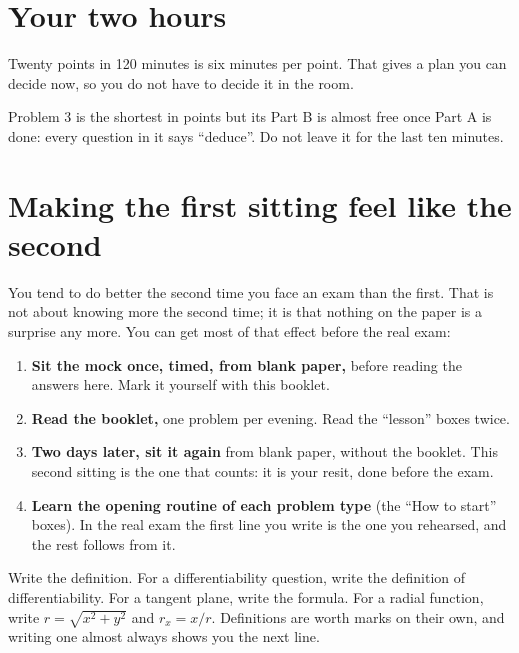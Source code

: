 \section{Your two hours}

Twenty points in 120 minutes is six minutes per point. That gives a plan you can decide now, so
you do not have to decide it in the room.

\begin{center}
\end{center}

Problem 3 is the shortest in points but its Part B is almost free once Part A is done: every
question in it says ``deduce''. Do not leave it for the last ten minutes.

\section{Making the first sitting feel like the second}

You tend to do better the second time you face an exam than the first. That is not about
knowing more the second time; it is that nothing on the paper is a surprise any more. You can
get most of that effect before the real exam:

\begin{enumerate}
  \item \textbf{Sit the mock once, timed, from blank paper,} before reading the answers here. Mark
  it yourself with this booklet.
  \item \textbf{Read the booklet,} one problem per evening. Read the ``lesson'' boxes twice.
  \item \textbf{Two days later, sit it again} from blank paper, without the booklet. This second
  sitting is the one that counts: it is your resit, done before the exam.
  \item \textbf{Learn the opening routine of each problem type} (the ``How to start'' boxes). In the
  real exam the first line you write is the one you rehearsed, and the rest follows from it.
\end{enumerate}

\begin{remember}[title={When you blank in the room}]
Write the definition. For a differentiability question, write the definition of differentiability.
For a tangent plane, write the formula. For a radial function, write $r=\sqrt{x^2+y^2}$ and
$r_x=x/r$. Definitions are worth marks on their own, and writing one almost always shows you the
next line.
\end{remember}
